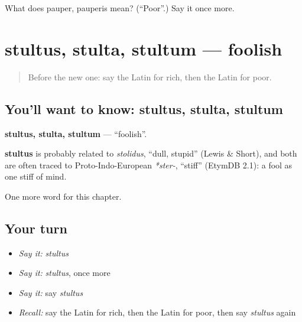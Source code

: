 \begin{tcolorbox}[breakable,colback=teal!4,colframe=teal!35!black,title={Before you move on}]
What does pauper, pauperis mean? (\textquotedblleft{}Poor\textquotedblright{}.) Say it once more.
\end{tcolorbox}
\section[stultus, stulta, stultum]{stultus, stulta, stultum — foolish}

\label{lesson:LA-C98-stultus}



\begin{quote}
Before the new one: say the Latin for rich, then the Latin for poor.
\end{quote}

\subsection*{You'll want to know: stultus, stulta, stultum}
\textbf{stultus, stulta, stultum} — \textquotedblleft{}foolish\textquotedblright{}.

\begin{cousinweb}
\textbf{stultus} is probably related to \emph{stolidus}, \textquotedblleft{}dull, stupid\textquotedblright{} (Lewis \& Short), and both are often traced to Proto-Indo-European \emph{*ster-}, \textquotedblleft{}stiff\textquotedblright{} (EtymDB 2.1): a fool as one stiff of mind.
\end{cousinweb}

\begin{grammarlens}[title={What you've built}]
One more word for this chapter.
\end{grammarlens}

\subsection*{Your turn}
\begin{itemize}
\raggedright
  \item \emph{Say it:} \emph{stultus}
  \item \emph{Say it:} \emph{stultus}, once more
  \item \emph{Say it:} say \emph{stultus}
  \item \emph{Recall:} say the Latin for rich, then the Latin for poor, then say \emph{stultus} again
\end{itemize}

